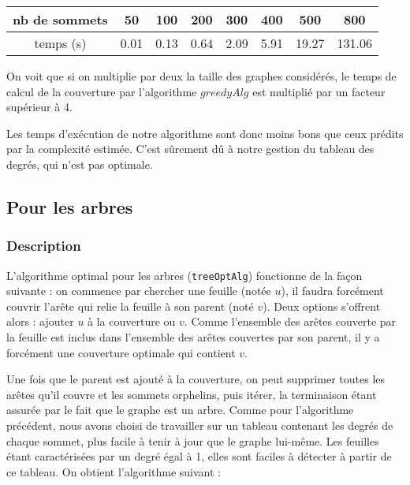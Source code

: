 \documentclass[a4paper,10pt]{article}
\begin{document}
\bigskip
\begin{tabular}{|c|c|c|c|c|c|c|c|}
	\hline 
	nb de sommets & 50 & 100 & 200 & 300 & 400 & 500 & 800  \\
	\hline
	temps (s) & 0.01 & 0.13 & 0.64 & 2.09 & 5.91 & 19.27 & 131.06 \\
	\hline
\end{tabular}

\bigskip

On voit que si on multiplie par deux la taille des graphes considérés, le temps de calcul de la couverture par l'algorithme $greedyAlg$ est multiplié par un facteur supérieur à 4.


Les temps d'exécution de notre algorithme sont donc moins bons que ceux prédits par la complexité estimée. C'est sûrement dû à notre gestion du tableau des degrés, qui n'est pas optimale.

\subsection{Pour les arbres}

\subsubsection{Description}

L'algorithme optimal pour les arbres (\texttt{treeOptAlg}) fonctionne de la façon suivante : on commence par chercher une feuille (notée $u$), il faudra forcément couvrir l'arête qui relie la feuille à son parent (noté $v$). Deux options s'offrent alors : ajouter $u$ à la couverture ou $v$. Comme l'ensemble des arêtes couverte par la feuille est inclus dans l'ensemble des arêtes couvertes par son parent, il y a forcément une couverture optimale qui contient $v$. 

Une fois que le parent est ajouté à la couverture, on peut supprimer toutes les arêtes qu'il couvre et les sommets orphelins, puis itérer, la terminaison étant assurée par le fait que le graphe est un arbre. Comme pour l'algorithme précédent, nous avons choisi de travailler sur un tableau contenant les degrés de chaque sommet, plus facile à tenir à jour que le graphe lui-même. Les feuilles étant caractérisées par un degré égal à 1, elles sont faciles à détecter à partir de ce tableau. On obtient l'algorithme suivant :
\end{document}
